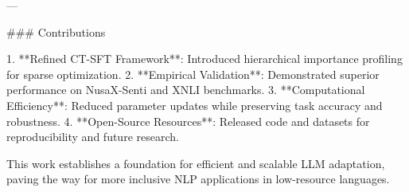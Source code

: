 ---

### Contributions

1. **Refined CT-SFT Framework**: Introduced hierarchical importance profiling for sparse optimization.
2. **Empirical Validation**: Demonstrated superior performance on NusaX-Senti and XNLI benchmarks.
3. **Computational Efficiency**: Reduced parameter updates while preserving task accuracy and robustness.
4. **Open-Source Resources**: Released code and datasets for reproducibility and future research.

This work establishes a foundation for efficient and scalable LLM adaptation, paving the way for more inclusive NLP applications in low-resource languages.